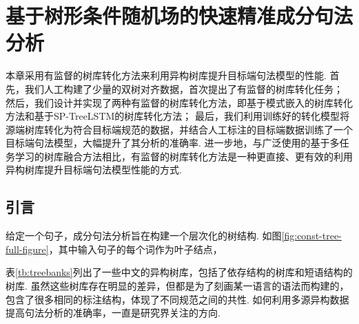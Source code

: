 \chapter{基于树形条件随机场的快速精准成分句法分析}
\label{sec:super_tc}
%


本章采用有监督的树库转化方法来利用异构树库提升目标端句法模型的性能.
首先，我们人工构建了少量的双树对齐数据，首次提出了有监督的树库转化任务；
然后，我们设计并实现了两种有监督的树库转化方法，即基于模式嵌入的树库转化方法和基于SP-TreeLSTM的树库转化方法；
最后，我们利用训练好的转化模型将源端树库转化为符合目标端规范的数据，并结合人工标注的目标端数据训练了一个目标端句法模型，大幅提升了其分析的准确率.
进一步地，与广泛使用的基于多任务学习的树库融合方法相比，有监督的树库转化方法是一种更直接、更有效的利用异构树库提升目标端句法模型性能的方式.


\section{引言}
给定一个句子，成分句法分析旨在构建一个层次化的树结构. 如图\ref{fig:const-tree-full-figure}，其中输入句子的每个词作为叶子结点，

表\ref{tb:treebanks}列出了一些中文的异构树库，包括了依存结构的树库和短语结构的树库.
虽然这些树库存在明显的差异，但都是为了刻画某一语言的语法而构建的，包含了很多相同的标注结构，体现了不同规范之间的共性.
如何利用多源异构数据提高句法分析的准确率，一直是研究界关注的方向.


